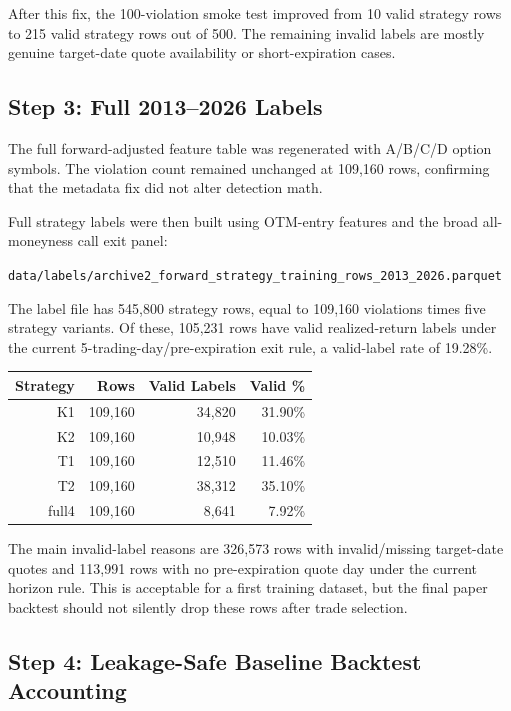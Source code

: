 \documentclass[11pt]{article}
\begin{document}
After this fix, the 100-violation smoke test improved from 10 valid strategy
rows to 215 valid strategy rows out of 500. The remaining invalid labels are
mostly genuine target-date quote availability or short-expiration cases.

\subsection*{Step 3: Full 2013--2026 Labels}

The full forward-adjusted feature table was regenerated with A/B/C/D option
symbols. The violation count remained unchanged at 109,160 rows, confirming
that the metadata fix did not alter detection math.

Full strategy labels were then built using OTM-entry features and the broad
all-moneyness call exit panel:

\begin{center}
\texttt{data/labels/archive2\_forward\_strategy\_training\_rows\_2013\_2026.parquet}
\end{center}

The label file has 545,800 strategy rows, equal to 109,160 violations times
five strategy variants. Of these, 105,231 rows have valid realized-return labels
under the current 5-trading-day/pre-expiration exit rule, a valid-label rate of
19.28\%.

\begin{center}
\begin{tabular}{rrrr}
\toprule
Strategy & Rows & Valid Labels & Valid \% \\
\midrule
K1 & 109,160 & 34,820 & 31.90\% \\
K2 & 109,160 & 10,948 & 10.03\% \\
T1 & 109,160 & 12,510 & 11.46\% \\
T2 & 109,160 & 38,312 & 35.10\% \\
full4 & 109,160 & 8,641 & 7.92\% \\
\bottomrule
\end{tabular}
\end{center}

The main invalid-label reasons are 326,573 rows with invalid/missing target-date
quotes and 113,991 rows with no pre-expiration quote day under the current
horizon rule. This is acceptable for a first training dataset, but the final
paper backtest should not silently drop these rows after trade selection.

\subsection*{Step 4: Leakage-Safe Baseline Backtest Accounting}
\end{document}
